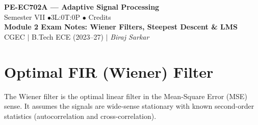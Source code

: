 \documentclass[12pt,a4paper]{article}
\begin{document}

\begin{center}
  {\LARGE\bfseries\color{myred} PE-EC702A --- Adaptive Signal Processing}\\[5pt]
  {\normalsize\color{mydark} Semester VII \quad$\bullet$\quad 3L:0T:0P \quad$\bullet$ Credits}\\[3pt]
  {\normalsize\color{myteal}\textbf{Module 2 Exam Notes: Wiener Filters, Steepest Descent \& LMS}}\\[3pt]
  {\small\color{mydark} CGEC \;$|$\; B.Tech ECE (2023--27) \;$|$\; \textit{Biraj Sarkar}}
\end{center}
\vspace{2pt}
\noindent{\color{myred}\rule{\linewidth}{1.5pt}}
\vspace{2pt}

\hypersetup{linkcolor=mydark}
\tableofcontents
\hypersetup{linkcolor=myteal}
\newpage

\section{Optimal FIR (Wiener) Filter}

The Wiener filter is the optimal linear filter in the Mean-Square Error (MSE) sense. It assumes the signals are wide-sense stationary with known second-order statistics (autocorrelation and cross-correlation).
\end{document}
